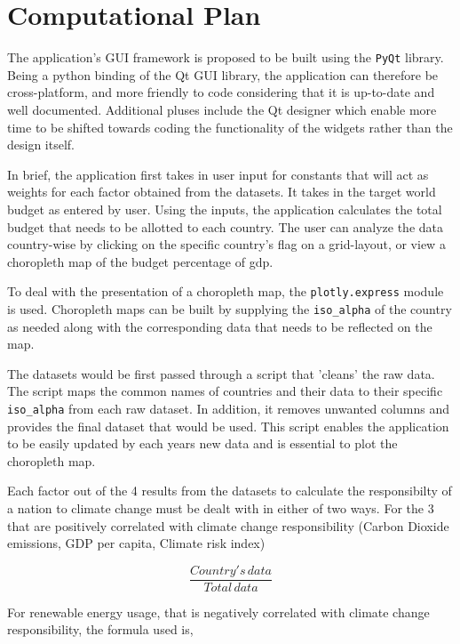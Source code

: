 \documentclass[fontsize=11pt]{article}
\begin{document}
\section*{Computational Plan}

The application's GUI framework is proposed to be built using the \texttt{PyQt} library.
Being a python binding of the Qt GUI library, the application can therefore be cross-platform, and more friendly to code
considering that it is up-to-date and well documented.
Additional pluses include the Qt designer which enable more time to be shifted towards coding the functionality of the
widgets rather than the design itself. \newline

In brief, the application first takes in user input for constants that will act as weights for each factor obtained
from the datasets.
It takes in the target world budget as entered by user.
Using the inputs, the application calculates the total budget that needs to be allotted to each country.
The user can analyze the data country-wise by clicking on the specific country's flag on a grid-layout, or view a
choropleth map of the budget percentage of gdp.\newline

To deal with the presentation of a choropleth map, the \texttt{plotly.express}
module is used.
Choropleth maps can be built by supplying the \texttt{iso\_alpha} of the country as needed along with the corresponding
data that needs to be reflected on the map. \newline

The datasets would be first passed through a script that 'cleans' the raw data.
The script maps the common names of countries and their data to their specific
\texttt{iso\_alpha} from each raw dataset.
In addition, it removes unwanted columns and provides the final dataset that would be used.
This script enables the application to be easily updated by each years new data and is essential to plot the choropleth map.
\newline

Each factor out of the 4 results from the datasets to calculate the responsibilty of a nation to climate change must be
dealt with in either of two ways.
For the 3 that are positively correlated with climate change responsibility (Carbon Dioxide emissions,
GDP per capita, Climate risk index)

\[
\frac{Country's \, data}{Total \, data}
\]

For renewable energy usage, that is negatively correlated with climate change responsibility, the formula used is,
\end{document}
